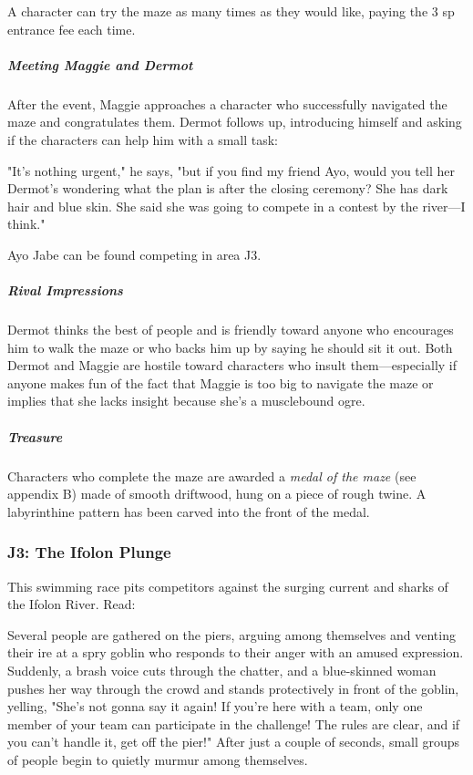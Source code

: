 \documentclass[10pt,a4paper,twoside,fancy,bg=print,twocolumn,openany,nodeprecatedcode]{dndbook}
\begin{document}
A character can try the maze as many times as they would like, paying the 3 sp entrance fee each time.

\subparagraph{Meeting Maggie and Dermot}
After the event, Maggie approaches a character who successfully navigated the maze and congratulates them. Dermot follows up, introducing himself and asking if the characters can help him with a small task:

\begin{DndReadAloud}{}
"It's nothing urgent," he says, "but if you find my friend Ayo, would you tell her Dermot's wondering what the plan is after the closing ceremony? She has dark hair and blue skin. She said she was going to compete in a contest by the river—I think."

\end{DndReadAloud}

Ayo Jabe can be found competing in area J3.

\subparagraph{Rival Impressions}
Dermot thinks the best of people and is friendly toward anyone who encourages him to walk the maze or who backs him up by saying he should sit it out. Both Dermot and Maggie are hostile toward characters who insult them—especially if anyone makes fun of the fact that Maggie is too big to navigate the maze or implies that she lacks insight because she's a musclebound ogre.

\subparagraph{Treasure}
Characters who complete the maze are awarded a \textit{medal of the maze} (see appendix B) made of smooth driftwood, hung on a piece of rough twine. A labyrinthine pattern has been carved into the front of the medal.

\subsubsection{J3: The Ifolon Plunge}
This swimming race pits competitors against the surging current and sharks of the Ifolon River. Read:

\begin{DndReadAloud}{}
Several people are gathered on the piers, arguing among themselves and venting their ire at a spry goblin who responds to their anger with an amused expression. Suddenly, a brash voice cuts through the chatter, and a blue-skinned woman pushes her way through the crowd and stands protectively in front of the goblin, yelling, "She's not gonna say it again! If you're here with a team, only one member of your team can participate in the challenge! The rules are clear, and if you can't handle it, get off the pier!" After just a couple of seconds, small groups of people begin to quietly murmur among themselves.

\end{DndReadAloud}
\end{document}
